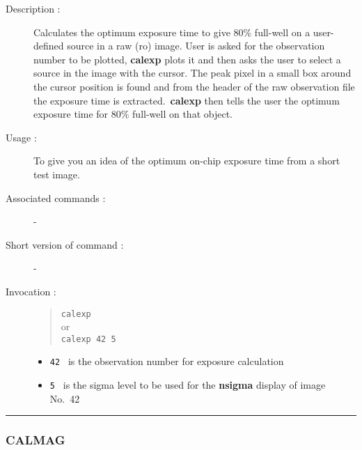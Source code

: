 \begin{description}

\item[Description :] Calculates the optimum exposure time to give 80\%
full-well on a user-defined source in a raw ({\sc ro}) image.  User is asked
for the observation number to be plotted, {\bf calexp} plots it and
then asks the user to select a source in the image with the cursor.
The peak pixel in a small box around the cursor position is found and
from the header of the raw observation file the exposure time is
extracted.\ {\bf calexp} then tells the user the optimum exposure time
for 80\% full-well on that object.

\item[Usage :] To give you an idea of the optimum on-chip exposure
time from a short test image.

\item[Associated commands :] -
\item[Short version of command :] -
\item[Invocation :]

\begin{quote}{\tt  calexp } \\
or \\
{\tt calexp 42 5 }
\end{quote}

\begin{itemize}

\item {\tt 42 } is the observation number for exposure calculation
\item {\tt 5 } is the sigma level to be used for the {\bf nsigma} display of 
image No.\ 42

\end{itemize}

\end{description}

\hrule 
\subsubsection*{\label{CALMAG}CALMAG}


